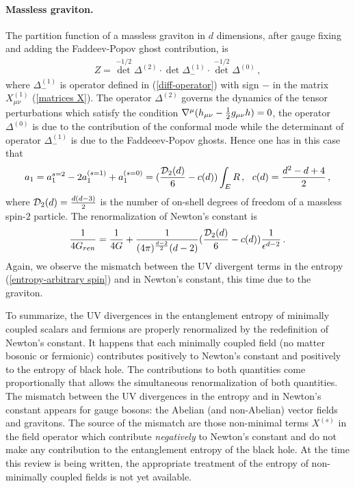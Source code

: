 \documentclass[12pt]{article}
\def\be{\begin{eqnarray}}
\def\ee{\end{eqnarray}}
\def\lb{\label}
\def\o{\over}
\begin{document}
\paragraph*{Massless graviton.} The partition function of a massless graviton in $d$ dimensions, after  gauge fixing and adding the Faddeev-Popov ghost contribution, is
\be
Z={\det}^{-1/2}\Delta^{(2)}\cdot\det\Delta_{-}^{(1)} \cdot {\det}^{-1/2}\Delta^{(0)}\, ,
\lb{Z-graviton}
\ee
where  $\Delta_-^{(1)}$ is operator defined in (\ref{diff-operator}) with sign $-$ in the matrix $X^{(1)}_{\mu\nu}$ (\ref{matrices X}). The operator $\Delta^{(2)}$ governs the dynamics of the tensor perturbations which satisfy the condition $\nabla^\mu(h_{\mu\nu}-{1\o 2}g_{\mu\nu}h)=0$, the operator $\Delta^{(0)}$ is due to the contribution of the conformal mode while
the determinant of operator $\Delta_{-}^{(1)}$ is due to the Faddeeev-Popov ghosts. 
Hence one has in this case that
\be
a_1=a_1^{s=2}-2a_1^{(s=1)}+a_1^{(s=0)}=({{\cal D}_2(d)\o 6}-c(d))\int_E R\, ,\ \ c(d)={d^2-d+4\o 2}\, ,
\lb{a1-graviton}
\ee
where ${\cal D}_2(d)={d(d-3)\o 2}$ is the number of on-shell degrees of freedom of a massless spin-$2$ particle.  The  renormalization of Newton's constant is
\be
{1\o 4G_{ren}}={1\o 4G}+{1\o (4\pi)^{d-2\o 2}(d-2)} ( {{\cal D}_{2}(d)\o 6}-c(d)) {1\o \epsilon^{d-2}}\, .
\lb{G-ren-vector}
\ee
Again, we observe the mismatch between the UV divergent terms in the entropy (\ref{entropy-arbitrary spin}) and in Newton's constant, this time due to the  graviton.

\medskip

To summarize, the UV divergences in the entanglement entropy of minimally coupled scalars and fermions are properly renormalized by the redefinition of Newton's constant. It happens that each minimally coupled field (no matter bosonic or fermionic)  contributes positively to Newton's constant and positively to the entropy of black hole. The contributions to both quantities come proportionally  that allows the simultaneous 
renormalization of both quantities.
The mismatch between the UV divergences in the entropy and in Newton's constant appears for gauge bosons: the Abelian (and non-Abelian)  vector fields and gravitons.
The source of the mismatch are those non-minimal terms $X^{(s)}$ in the field operator which contribute {\it negatively} to Newton's constant and do not make any contribution to the entanglement entropy of the black hole. At the time this review is being written, 
the appropriate treatment of the entropy of non-minimally coupled fields is not yet available.
\end{document}
